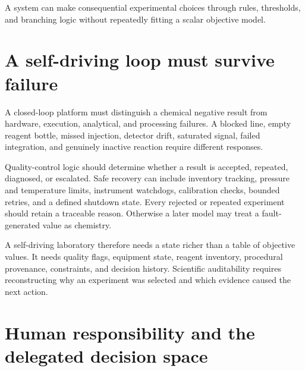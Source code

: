 \begin{conceptbox}
  A system can make consequential experimental choices through rules, thresholds, and branching logic without repeatedly fitting a scalar objective model.
\end{conceptbox}

\section{A self-driving loop must survive failure}

A closed-loop platform must distinguish a chemical negative result from hardware, execution, analytical, and processing failures.
A blocked line, empty reagent bottle, missed injection, detector drift, saturated signal, failed integration, and genuinely inactive reaction require different responses.

Quality-control logic should determine whether a result is accepted, repeated, diagnosed, or escalated.
Safe recovery can include inventory tracking, pressure and temperature limits, instrument watchdogs, calibration checks, bounded retries, and a defined shutdown state.
Every rejected or repeated experiment should retain a traceable reason.
Otherwise a later model may treat a fault-generated value as chemistry.


A self-driving laboratory therefore needs a state richer than a table of objective values.
It needs quality flags, equipment state, reagent inventory, procedural provenance, constraints, and decision history.
Scientific auditability requires reconstructing why an experiment was selected and which evidence caused the next action.

\section{Human responsibility and the delegated decision space}

